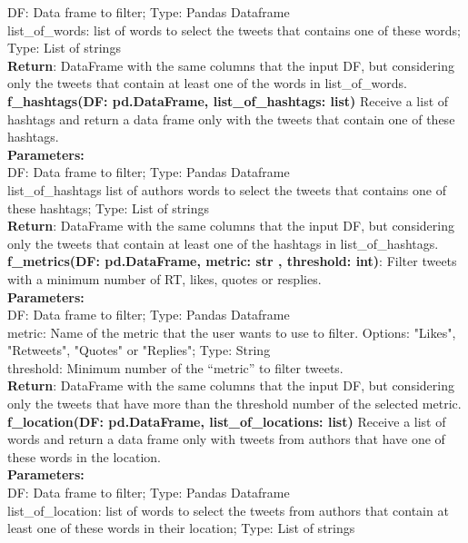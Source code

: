 DF: Data frame to filter; Type: Pandas Dataframe\\
list\_of\_words: list of words to select the tweets that contains one of these words; Type: List of strings\\
\textbf{Return}: DataFrame with the same columns that the input DF, but considering only the tweets that contain at least one of the words in list\_of\_words.
\newline 
\newline
\noindent\textbf{f\_hashtags(DF: pd.DataFrame, list\_of\_hashtags: list)}
Receive a list of hashtags and return a data frame only with the tweets that contain one of these hashtags.\\
\textbf{Parameters:}\\
DF: Data frame to filter; Type: Pandas Dataframe\\
list\_of\_hashtags list of authors words to select the tweets that contains one of these hashtags; Type: List of strings\\
\textbf{Return}: DataFrame with the same columns that the input DF, but considering only the tweets that contain at least one of the hashtags in list\_of\_hashtags.
\newline 
\newline
\noindent\textbf{f\_metrics(DF: pd.DataFrame, metric: str , threshold: int)}:
Filter tweets with a minimum number of RT, likes, quotes or resplies.\\ 
\textbf{Parameters:}\\
DF: Data frame to filter; Type: Pandas Dataframe\\
metric: Name of the metric that the user wants to use to filter. Options: "Likes", "Retweets", "Quotes" or "Replies"; Type: String\\
threshold: Minimum number of the “metric” to filter tweets.\\
\textbf{Return}: DataFrame with the same columns that the input DF, but considering only the tweets that have more than the threshold number of the selected metric.
\newline 
\newline
\noindent\textbf{f\_location(DF: pd.DataFrame, list\_of\_locations: list)}
Receive a list of words and return a data frame only with tweets from authors that have one of these words in the location.\\
\textbf{Parameters:}\\
DF: Data frame to filter; Type: Pandas Dataframe\\
list\_of\_location: list of words to select the tweets from authors that contain at least one of these words in their location; Type: List of strings\\
